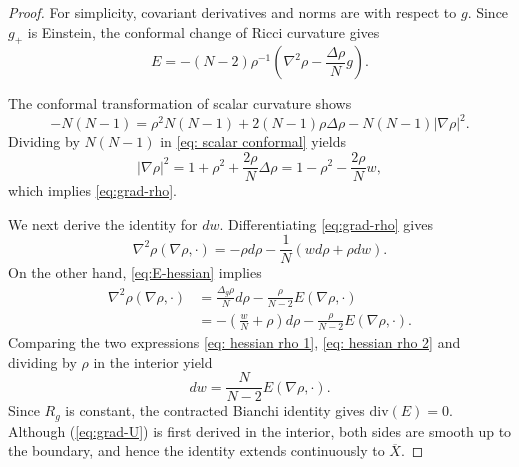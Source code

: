 \documentclass[11pt,letterpaper]{amsart}
\theoremstyle{definition}
\theoremstyle{remark}
\numberwithin{equation}{section}
\newcommand{\barX}{\overline X}
\begin{document}
\begin{proof}
For simplicity, covariant derivatives and norms are with respect to $g$.
Since $g_{+}$ is Einstein, the conformal change of Ricci curvature gives
\begin{equation}\label{eq:E-hessian}
E=-(N-2) \rho^{-1}\left(\nabla^2 \rho-\frac{\Delta \rho}{N} g\right).
\end{equation}

The conformal transformation of scalar curvature shows 
\begin{equation}\label{eq: scalar conformal}
 -N(N-1)
        =\rho^2N(N-1)+2(N-1)\rho\Delta\rho
         -N(N-1)|\nabla\rho|^2.
\end{equation}
Dividing by $N(N-1)$ in \eqref{eq: scalar conformal} yields
\[
|\nabla \rho|^2=1+\rho^2+\frac{2 \rho}{N} \Delta \rho=1-\rho^2-\frac{2 \rho}{N} w,
\]
which implies \eqref{eq:grad-rho}. 

We next derive the identity for $dw$. Differentiating  \eqref{eq:grad-rho} gives
\begin{equation}\label{eq: hessian rho 1}
 \nabla^2 \rho(\nabla \rho, \cdot)=- \rho d \rho-\frac{1}{N}(w d \rho+\rho d w).
\end{equation}
On the other hand, \eqref{eq:E-hessian} implies
\begin{equation}\label{eq: hessian rho 2}
\begin{aligned}
\nabla^2 \rho(\nabla \rho, \cdot)&=\frac{\Delta_g \rho}{N} d \rho-\frac{\rho}{N-2} E(\nabla \rho, \cdot)\\
&=-\left(\frac{w}{N}+\rho\right) d \rho-\frac{\rho}{N-2} E(\nabla \rho, \cdot).
\end{aligned}
\end{equation}
Comparing the two expressions \eqref{eq: hessian rho 1}, \eqref{eq: hessian rho 2} and dividing by $\rho$ in the interior yield
\begin{equation}\label{eq:grad-U}
        d w=\frac{N}{N-2}E(\nabla\rho,\cdot).
\end{equation}
Since $R_g$ is constant, the contracted Bianchi identity gives $\text{div}(E)=0$. Although (\ref{eq:grad-U}) is first derived in the interior, both sides are smooth up to
the boundary, and hence the identity extends continuously to \(\barX\).


\end{proof}
\end{document}
